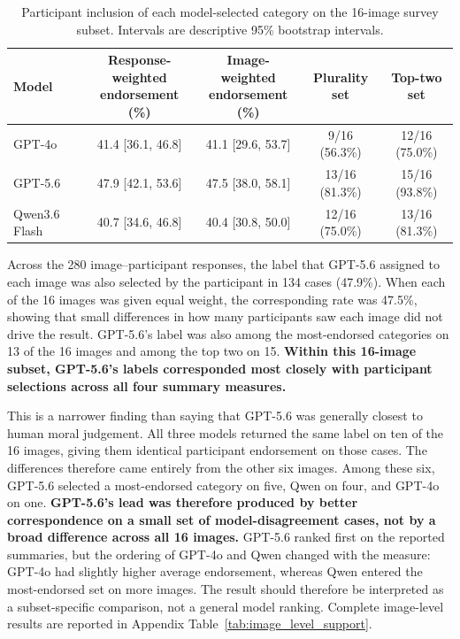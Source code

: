 \begin{table}[!htbp]
    \centering
    \caption{Participant inclusion of each model-selected category on the
    16-image survey subset. Intervals are descriptive 95\% bootstrap
    intervals.}
    \label{tab:human_support_summary}
    \footnotesize
    \setlength{\tabcolsep}{4pt}
    \begin{tabular}{lcccc}
        \toprule
        Model & \shortstack{Response-weighted\\endorsement (\%)} &
        \shortstack{Image-weighted\\endorsement (\%)} &
        \shortstack{Plurality\\set} &
        \shortstack{Top-two\\set} \\
        \midrule
        GPT-4o & 41.4 [36.1, 46.8] & 41.1 [29.6, 53.7] &
        9/16 (56.3\%) & 12/16 (75.0\%) \\
        GPT-5.6 & 47.9 [42.1, 53.6] & 47.5 [38.0, 58.1] &
        13/16 (81.3\%) & 15/16 (93.8\%) \\
        Qwen3.6 Flash & 40.7 [34.6, 46.8] & 40.4 [30.8, 50.0] &
        12/16 (75.0\%) & 13/16 (81.3\%) \\
        \bottomrule
    \end{tabular}
\end{table}

Across the 280 image--participant responses, the label that GPT-5.6 assigned
to each image was also selected by the participant in 134 cases (47.9\%). When
each of the 16 images was given equal weight, the corresponding rate was
47.5\%, showing that small differences in how many participants saw each image
did not drive the result. GPT-5.6's label was also among the most-endorsed
categories on 13 of the 16 images and among the top two on 15.
\textbf{Within this 16-image subset, GPT-5.6's labels corresponded most closely
with participant selections across all four summary measures.}

This is a narrower finding than saying that GPT-5.6 was generally closest to
human moral judgement. All three models returned the same label on ten of the
16 images, giving them identical participant endorsement on those cases. The
differences therefore came entirely from the other six images. Among these six,
GPT-5.6 selected a most-endorsed category on five, Qwen on four, and GPT-4o on
one. \textbf{GPT-5.6's lead was therefore produced by better correspondence on
a small set of model-disagreement cases, not by a broad difference across all
16 images.} GPT-5.6 ranked first on the reported summaries, but the ordering of
GPT-4o and Qwen changed with the measure: GPT-4o had slightly higher average
endorsement, whereas Qwen entered the most-endorsed set on more images. The
result should therefore be interpreted as a subset-specific comparison, not a
general model ranking. Complete image-level results are reported in Appendix
Table~\ref{tab:image_level_support}.

